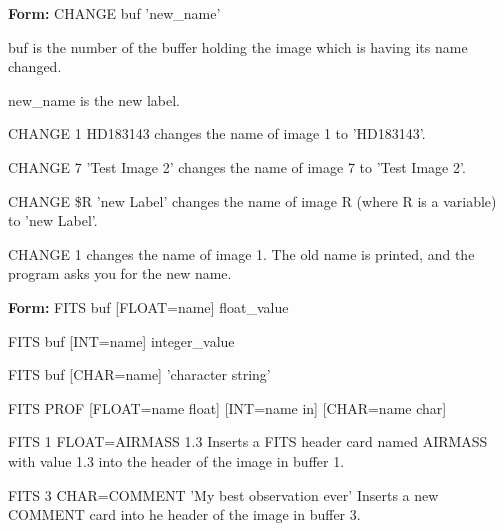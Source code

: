 {\newpage\clearpage
{}%
\begin{command} 
  \item[\textbf{Form: } CHANGE buf 'new\_name'\hfill]{}
  \item[buf]{is the number of the buffer holding the 
       image which is having its name changed.}
  \item[new\_name]{is the new label.}
\end{command}%
\lthtmlfigureZ
\lthtmlcheckvsize\clearpage}

{\newpage\clearpage
{}%
\begin{example}
  \item[CHANGE 1 HD183143\hfill]{changes the name of image 1 to 'HD183143'. }
  \item[CHANGE 7 'Test Image 2'\hfill]{changes the name of image 7 to 
       'Test Image 2'.}
  \item[CHANGE \$R 'new Label'\hfill]{changes the name of image R (where R
       is a variable) to 'new Label'.}
  \item[CHANGE 1\hfill]{changes the name of image 1.  The old 
       name is printed, and the program asks you for the new name.}
\end{example}%
\lthtmlfigureZ
\lthtmlcheckvsize\clearpage}

{\newpage\clearpage
{}%
\begin{command}
  \item[\textbf{Form: } FITS buf {[FLOAT=name]} float\_value\hfill]{}
  \item[FITS buf {[INT=name]} integer\_value\hfill]{}
  \item[FITS buf {[CHAR=name]} 'character string'\hfill]{}
  \item[FITS PROF {[FLOAT=name float]} {[INT=name in]} {[CHAR=name char]}\hfill]{}
\end{command}%
\lthtmlfigureZ
\lthtmlcheckvsize\clearpage}

{\newpage\clearpage
{}%
\begin{example}
  \item[FITS 1 FLOAT=AIRMASS 1.3\hfill]{Inserts a FITS header card named
        AIRMASS with value 1.3 into the header of the image in buffer 1.}
  \item[FITS 3 CHAR=COMMENT 'My best observation ever'\hfill]{
        Inserts a new COMMENT card into he header of the image in buffer 3.}
\end{example}%
\lthtmlfigureZ
\lthtmlcheckvsize\clearpage}

